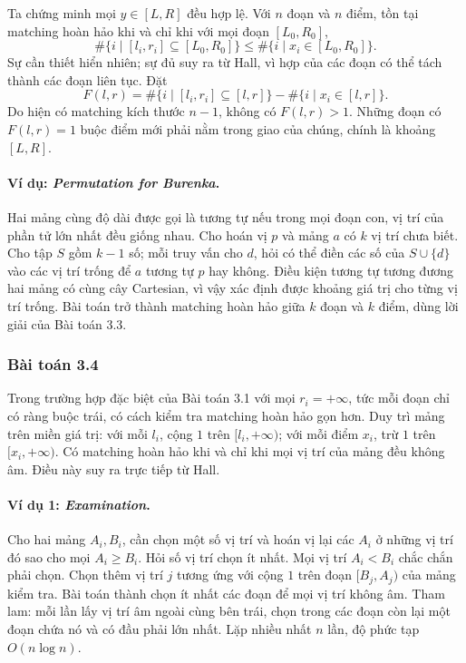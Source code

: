 \documentclass[11pt]{article}
\begin{document}
Ta chứng minh mọi \(y\in [L,R]\) đều hợp lệ. Với \(n\) đoạn và \(n\) điểm, tồn
tại matching hoàn hảo khi và chỉ khi với mọi đoạn \([L_0,R_0]\),
\[
  \#\{i\mid [l_i,r_i]\subseteq [L_0,R_0]\}
  \le
  \#\{i\mid x_i\in [L_0,R_0]\}.
\]
Sự cần thiết hiển nhiên; sự đủ suy ra từ Hall, vì hợp của các đoạn có thể tách
thành các đoạn liên tục. Đặt
\[
  F(l,r)=\#\{i\mid [l_i,r_i]\subseteq [l,r]\}
  -\#\{i\mid x_i\in [l,r]\}.
\]
Do hiện có matching kích thước \(n-1\), không có \(F(l,r)>1\). Những đoạn có
\(F(l,r)=1\) buộc điểm mới phải nằm trong giao của chúng, chính là khoảng
\([L,R]\).

\paragraph{Ví dụ: \emph{Permutation for Burenka}.}
Hai mảng cùng độ dài được gọi là tương tự nếu trong mọi đoạn con, vị trí của
phần tử lớn nhất đều giống nhau. Cho hoán vị \(p\) và mảng \(a\) có \(k\) vị
trí chưa biết. Cho tập \(S\) gồm \(k-1\) số; mỗi truy vấn cho \(d\), hỏi có thể
điền các số của \(S\cup\{d\}\) vào các vị trí trống để \(a\) tương tự \(p\) hay
không. Điều kiện tương tự tương đương hai mảng có cùng cây Cartesian, vì vậy
xác định được khoảng giá trị cho từng vị trí trống. Bài toán trở thành matching
hoàn hảo giữa \(k\) đoạn và \(k\) điểm, dùng lời giải của Bài toán 3.3.

\subsubsection{Bài toán 3.4}

Trong trường hợp đặc biệt của Bài toán 3.1 với mọi \(r_i=+\infty\), tức mỗi
đoạn chỉ có ràng buộc trái, có cách kiểm tra matching hoàn hảo gọn hơn. Duy trì
mảng trên miền giá trị: với mỗi \(l_i\), cộng \(1\) trên \([l_i,+\infty)\);
với mỗi điểm \(x_i\), trừ \(1\) trên \([x_i,+\infty)\). Có matching hoàn hảo
khi và chỉ khi mọi vị trí của mảng đều không âm. Điều này suy ra trực tiếp từ
Hall.

\paragraph{Ví dụ 1: \emph{Examination}.}
Cho hai mảng \(A_i,B_i\), cần chọn một số vị trí và hoán vị lại các \(A_i\) ở
những vị trí đó sao cho mọi \(A_i\ge B_i\). Hỏi số vị trí chọn ít nhất. Mọi vị
trí \(A_i<B_i\) chắc chắn phải chọn. Chọn thêm vị trí \(j\) tương ứng với cộng
\(1\) trên đoạn \([B_j,A_j)\) của mảng kiểm tra. Bài toán thành chọn ít nhất
các đoạn để mọi vị trí không âm. Tham lam: mỗi lần lấy vị trí âm ngoài cùng bên
trái, chọn trong các đoạn còn lại một đoạn chứa nó và có đầu phải lớn nhất.
Lặp nhiều nhất \(n\) lần, độ phức tạp \(O(n\log n)\).
\end{document}
